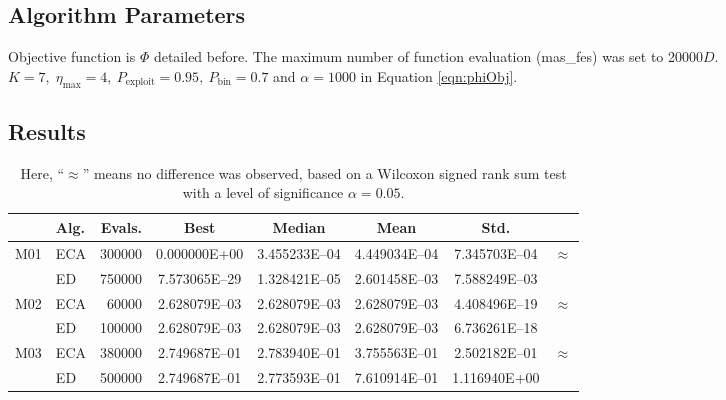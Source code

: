\documentclass[12pt,letterpape]{article}
\begin{document}

\subsection{Algorithm Parameters} %
\label{sub:algorithm_parameters}

Objective function is $\Phi$ detailed before. The maximum number of function evaluation
(mas\_fes) was set to 20000$D$. $K = 7, \; \eta_{\max} = 4,\ P_{\text{exploit}} = 0.95,\ P_{\text{bin}} = 0.7$ and $\alpha = 1000$ in Equation \ref{eqn:phiObj}.

\subsection{Results} %
\label{sec:results}

\begin{table}[!ht]
\centering
\begin{tabular}{clrccccc}
	\hline
	 & {\bf Alg.} & {\bf Evals}.  & {\bf Best} & {\bf Median} & {\bf Mean} & {\bf Std.} \\ \hline
	\multirow{2}{*}{M01}
	& ECA & 300000  & 0.000000E+00  & 3.455233E--04 & 4.449034E--04 & 7.345703E--04 &
	\multirow{2}{*}{$ \approx $}\\  
	& ED  & 750000  & 7.573065E--29 & 1.328421E--05 & 2.601458E--03 & 7.588249E--03 &  \\ \hline
	\multirow{2}{*}{M02}
	& ECA &  60000  & 2.628079E--03 & 2.628079E--03 & 2.628079E--03 & 4.408496E--19 & 
	\multirow{2}{*}{$ \approx $}\\ 
	& ED  & 100000  & 2.628079E--03 & 2.628079E--03 & 2.628079E--03 & 6.736261E--18 &  \\ \hline
	\multirow{2}{*}{M03}
	& ECA & 380000  & 2.749687E--01 & 2.783940E--01 & 3.755563E--01 & 2.502182E--01 & 
	\multirow{2}{*}{$ \approx $}\\ 
	& ED  & 500000  & 2.749687E--01 & 2.773593E--01 & 7.610914E--01 & 1.116940E+00  &  \\ \hline
\end{tabular}
\caption{Here, ``$\approx$'' means no difference was observed, based on a Wilcoxon signed rank sum test with a level of significance $\alpha = 0.05$.}
\end{table}
\end{document}
